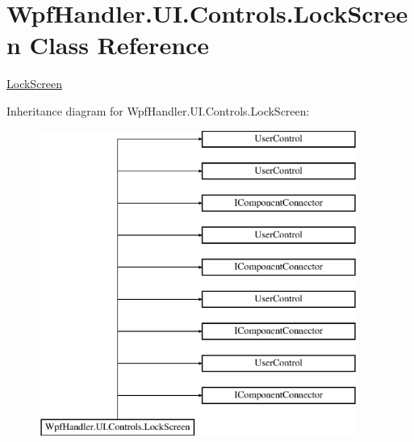 \hypertarget{class_wpf_handler_1_1_u_i_1_1_controls_1_1_lock_screen}{}\section{Wpf\+Handler.\+U\+I.\+Controls.\+Lock\+Screen Class Reference}
\label{class_wpf_handler_1_1_u_i_1_1_controls_1_1_lock_screen}


\mbox{\hyperlink{class_wpf_handler_1_1_u_i_1_1_controls_1_1_lock_screen}{Lock\+Screen}}  


Inheritance diagram for Wpf\+Handler.\+U\+I.\+Controls.\+Lock\+Screen\+:\begin{figure}[H]
\begin{center}
\leavevmode
\includegraphics[height=10.000000cm]{dc/d68/class_wpf_handler_1_1_u_i_1_1_controls_1_1_lock_screen}
\end{center}
\end{figure}
